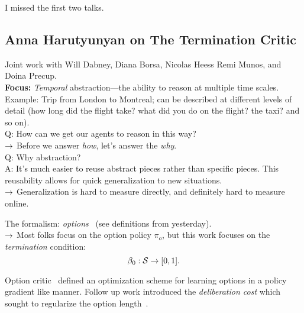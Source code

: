 I missed the first two talks.

\subsection{Anna Harutyunyan on The Termination Critic}

Joint work with Will Dabney, Diana Borsa, Nicolas Heess Remi Munos, and Doina Precup. \\

{\bf Focus:} {\it Temporal} abstraction---the ability to reason at multiple time scales. \\

Example: Trip from London to Montreal; can be described at different levels of detail (how long did the flight take? what did you do on the flight? the taxi? and so on). \\

Q: How can we get our agents to reason in this way? \\

$\rightarrow$ Before we answer {\it how}, let's answer the {\it why}. \\

Q: Why abstraction? \\

A: It's much easier to reuse abstract pieces rather than specific pieces. This reusability allows for quick generalization to new situations. \\

$\rightarrow$ Generalization is hard to measure directly, and definitely hard to measure online. \\


The formalism: {\it options}~\cite{sutton1999between} (see definitions from yesterday).\\

$\rightarrow$ Most folks focus on the option policy $\pi_o$, but this work focuses on the {\it termination} condition:
\[
\beta_0 : \mathcal{S} \rightarrow [0,1].
\]

Option critic~\cite{bacon2017option} defined an optimization scheme for learning options in a policy gradient like manner. Follow up work introduced the {\it deliberation cost} which sought to regularize the option length~\cite{harb2018waiting}. \\

